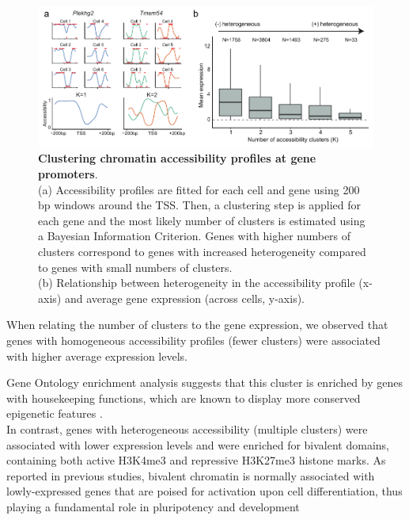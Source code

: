 \begin{figure}[H]
	\centering
	\includegraphics[width=0.9\linewidth]{scNMT_profiles_clusters}
	\caption[]{
	\textbf{Clustering chromatin accessibility profiles at gene promoters}. \\
	(a) Accessibility profiles are fitted for each cell and gene using 200 bp windows around the TSS. Then, a clustering step is applied for each gene and the most likely number of clusters is estimated using a Bayesian Information Criterion. Genes with higher numbers of clusters correspond to genes with increased heterogeneity compared to genes with small numbers of clusters.\\
	(b) Relationship between heterogeneity in the accessibility profile (x-axis) and average gene expression (across cells, y-axis).
	}
	\label{fig:scnmt_profiles_clusters}
\end{figure}

When relating the number of clusters to the gene expression, we observed that genes with homogeneous accessibility profiles (fewer clusters) were associated with higher average expression levels. 

Gene Ontology enrichment analysis suggests that this cluster is enriched by genes with housekeeping functions, which are known to display more conserved epigenetic features \cite{She2009}.\\
In contrast, genes with heterogeneous accessibility (multiple clusters) were associated with lower expression levels and were enriched for bivalent domains, containing both active H3K4me3 and repressive H3K27me3 histone marks. As reported in previous studies, bivalent chromatin is normally associated with lowly-expressed genes that are poised for activation upon cell differentiation, thus playing a fundamental role in pluripotency and development \cite{Vastenhouw2012,Bernstein2006}

